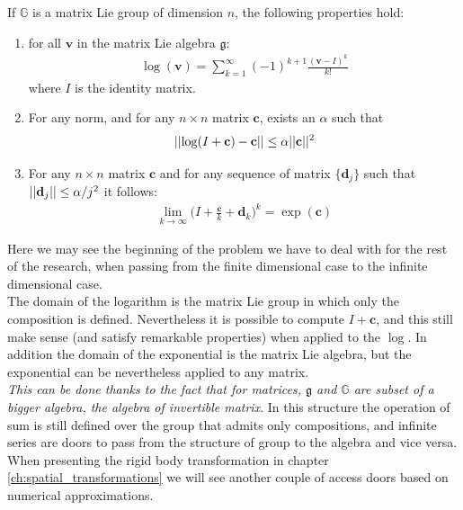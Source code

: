 \noindent
If $\mathbb{G}$ is a matrix Lie group of dimension $n$, the following properties hold:
\begin{enumerate}
	\item for all $\mathbf{v}$ in the matrix Lie algebra $\mathfrak{g}$:
	\begin{align*}
	\log(\mathbf{v}) = \sum_{k=1}^{\infty}(-1)^{k+1} \frac{(\mathbf{v}-I)^{k} }{k!}
	\end{align*}
	where $I$ is the identity matrix.
	\item For any norm, and for any $n\times n$ matrix $\mathbf{c}$, exists an $\alpha$ such that 
	\begin{align*}
	\vert\lvert  \log(I + \mathbf{c}) - \mathbf{c}  \rvert\vert  \leq \alpha \vert\lvert  \mathbf{c} \rvert\vert^{2}
	\end{align*}
	\item For any $n\times n$ matrix $\mathbf{c}$ and for any sequence of matrix $\{\mathbf{d}_{j}\}$ such that  $\vert\lvert  \mathbf{d}_{j} \rvert\vert \leq \alpha/j^2$ it follows:
	\begin{align*}
	\lim_{k\rightarrow \infty} \big( I + \frac{\mathbf{c}}{k} + \mathbf{d}_{k} \big)^{k} = \exp{(\mathbf{c})}
	\end{align*}
\end{enumerate} 
Here we may see the beginning of the problem we have to deal with for the rest of the research, when passing from the finite dimensional case to the infinite dimensional case.\\
The domain of the logarithm is the matrix Lie group in which only the composition is defined. Nevertheless it is possible to compute $I + \mathbf{c}$, and this still make sense (and satisfy remarkable properties) when applied to the $\log$. In addition the domain of the exponential is the matrix Lie algebra, but the exponential can be nevertheless applied to any matrix.\\
\emph{This can be done thanks to the fact that for matrices, $\mathfrak{g}$ and $\mathbb{G}$ are subset of a bigger algebra, the algebra of invertible matrix}. In this structure the operation of sum is still defined over the group that admits only compositions, and infinite series are doors to pass from the structure of group to the algebra and vice versa. When presenting the rigid body transformation in chapter \ref{ch:spatial_transformations} we will see another couple of access doors based on numerical approximations.\\

